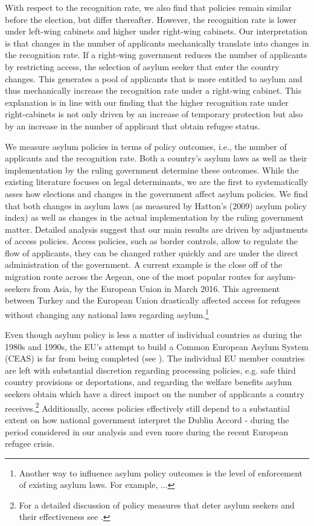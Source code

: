 \documentclass[a4paper,12pt]{article}
\begin{document}
With respect to the recognition rate, we also find that policies remain similar before the election, but differ thereafter. However, the recognition rate is lower under left-wing cabinets and higher under right-wing cabinets. Our interpretation is that changes in the number of applicants mechanically translate into changes in the recognition rate. If a right-wing government reduces the number of applicants by restricting access, the selection of asylum seeker that enter the country changes. This generates a pool of applicants that is more entitled to asylum and thus mechanically increase the recognition rate under a right-wing cabinet. This explanation is in line with our finding that the higher recognition rate under right-cabinets is not only driven by an increase of temporary protection but also by an increase in the number of applicant that obtain refugee status. 

We measure asylum policies in terms of policy outcomes, i.e., the number of applicants and the recognition rate. Both a country's asylum laws as well as their implementation by the ruling government determine these outcomes. While the existing literature focuses on legal determinants, we are the first to systematically asses how elections and changes in the government affect asylum policies. We find that both changes in asylum laws (as measured by Hatton's (2009) 
asylum policy index) as well as changes in the actual implementation by the ruling government matter. Detailed analysis suggest that our main results are driven by adjustments of access policies. Access policies, such as border controls, allow to regulate the flow of applicants, they can be changed rather quickly and are under the direct administration of the government. A current example is the close off of the migration route across the Aegean, one of the most popular routes for asylum-seekers from Asia, by the European Union in March 2016. This agreement between Turkey and the European Union drastically affected access for refugees without changing any national laws regarding asylum.\footnote{Another way to influence asylum policy outcomes is the level of enforcement of existing asylum laws. For example, ...} 

Even though asylum policy is less a matter of individual countries as during the 1980s and 1990s, the EU's attempt to build a Common European Asylum System (CEAS) is far from being completed (see \citet{hatton2015EU}). The individual EU member countries are left with substantial discretion regarding processing policies, e.g. safe third country provisions or deportations, and regarding the welfare benefits asylum seekers obtain which have a direct impact on the number of applicants a country receives.\footnote{For a detailed discussion of policy measures that deter asylum seekers and their effectiveness see \citet{thielemann2006}.} Additionally, access policies effectively still depend to a substantial extent on how national government interpret the Dublin Accord - during the period considered in our analysis and even more during the recent European refugee crisis.
\end{document}

